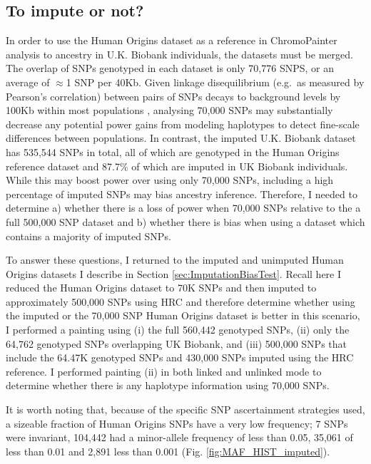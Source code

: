 \subsection{To impute or not?}

In order to use the Human Origins dataset as a reference in ChromoPainter analysis to ancestry in U.K. Biobank individuals, the datasets must be merged. The overlap of SNPs genotyped in each dataset is only 70,776 SNPS, or an average of $\approx$1 SNP per 40Kb. Given linkage disequilibrium (e.g.\ as measured by Pearson's correlation) between pairs of SNPs decays to background levels by 100Kb within most populations \cite{bosch2009decay}, analysing 70,000 SNPs may substantially decrease any potential power gains from modeling haplotypes to detect fine-scale differences between populations. In contrast, the imputed U.K. Biobank dataset has 535,544 SNPs in total, all of which are genotyped in the Human Origins reference dataset and 87.7\% of which are imputed in UK Biobank individuals. While this may boost power over using only 70,000 SNPs, including a high percentage of imputed SNPs may bias ancestry inference. Therefore, I needed to determine a) whether there is a loss of power when 70,000 SNPs relative to the a full 500,000 SNP dataset and b) whether there is bias when using a dataset which contains a majority of imputed SNPs.  

To answer these questions, I returned to the imputed and unimputed Human Origins datasets I describe in Section \ref{sec:ImputationBiasTest}. Recall here I reduced the Human Origins dataset to 70K SNPs and then imputed to approximately 500,000 SNPs using HRC and therefore determine whether using the imputed or the 70,000 SNP Human Origins dataset is better in this scenario, I performed a painting using (i) the full 560,442 genotyped SNPs, (ii) only the 64,762 genotyped SNPs overlapping UK Biobank, and (iii) 500,000 SNPs that include the 64.47K genotyped SNPs and 430,000 SNPs imputed using the HRC reference. I performed painting (ii) in both linked and unlinked mode to determine whether there is any haplotype information using 70,000 SNPs.

It is worth noting that, because of the specific SNP ascertainment strategies used, a sizeable fraction of Human Origins SNPs have a very low frequency; 7 SNPs were invariant, 104,442 had a minor-allele frequency of less than 0.05, 35,061 of less than 0.01 and 2,891 less than 0.001 (Fig. \ref{fig:MAF_HIST_imputed}).


